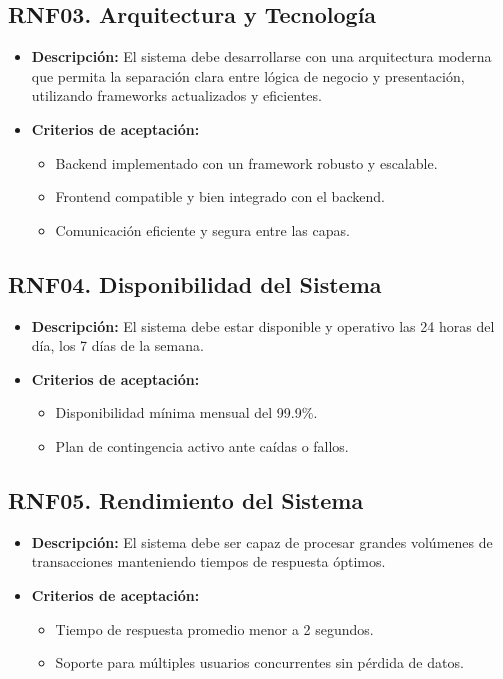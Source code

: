 	\subsection*{RNF03. Arquitectura y Tecnología}
		\begin{itemize}
			\item \textbf{Descripción:} El sistema debe desarrollarse con una arquitectura moderna que permita la separación clara entre lógica de negocio y presentación, utilizando frameworks actualizados y eficientes.
			\item \textbf{Criterios de aceptación:}
			\begin{itemize}
				\item Backend implementado con un framework robusto y escalable.
				\item Frontend compatible y bien integrado con el backend.
				\item Comunicación eficiente y segura entre las capas.
			\end{itemize}
		\end{itemize}
	
	\subsection*{RNF04. Disponibilidad del Sistema}
		\begin{itemize}
			\item \textbf{Descripción:} El sistema debe estar disponible y operativo las 24 horas del día, los 7 días de la semana.
			\item \textbf{Criterios de aceptación:}
			\begin{itemize}
				\item Disponibilidad mínima mensual del 99.9\%.
				\item Plan de contingencia activo ante caídas o fallos.
			\end{itemize}
		\end{itemize}
	
	\subsection*{RNF05. Rendimiento del Sistema}
		\begin{itemize}
			\item \textbf{Descripción:} El sistema debe ser capaz de procesar grandes volúmenes de transacciones manteniendo tiempos de respuesta óptimos.
			\item \textbf{Criterios de aceptación:}
			\begin{itemize}
				\item Tiempo de respuesta promedio menor a 2 segundos.
				\item Soporte para múltiples usuarios concurrentes sin pérdida de datos.
			\end{itemize}
		\end{itemize}
	
